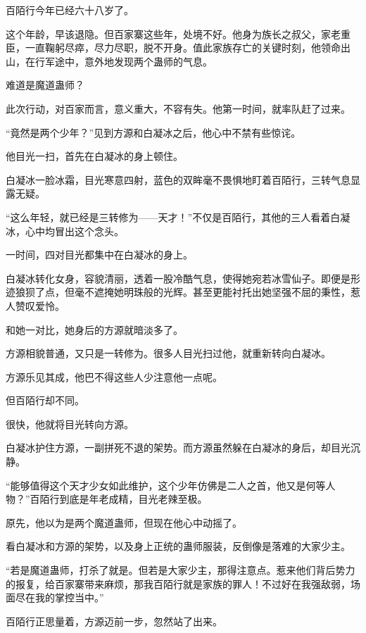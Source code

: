 
\begin{this_body}



百陌行今年已经六十八岁了。

这个年龄，早该退隐。但百家寨这些年，处境不好。他身为族长之叔父，家老重臣，一直鞠躬尽瘁，尽力尽职，脱不开身。值此家族存亡的关键时刻，他领命出山，在行军途中，意外地发现两个蛊师的气息。

难道是魔道蛊师？

此次行动，对百家而言，意义重大，不容有失。他第一时间，就率队赶了过来。

“竟然是两个少年？”见到方源和白凝冰之后，他心中不禁有些惊诧。

他目光一扫，首先在白凝冰的身上顿住。

白凝冰一脸冰霜，目光寒意四射，蓝色的双眸毫不畏惧地盯着百陌行，三转气息显露无疑。

“这么年轻，就已经是三转修为——天才！”不仅是百陌行，其他的三人看着白凝冰，心中均冒出这个念头。

一时间，四对目光都集中在白凝冰的身上。

白凝冰转化女身，容貌清丽，透着一股冷酷气息，使得她宛若冰雪仙子。即便是形迹狼狈了点，但毫不遮掩她明珠般的光辉。甚至更能衬托出她坚强不屈的秉性，惹人赞叹爱怜。

和她一对比，她身后的方源就暗淡多了。

方源相貌普通，又只是一转修为。很多人目光扫过他，就重新转向白凝冰。

方源乐见其成，他巴不得这些人少注意他一点呢。

但百陌行却不同。

很快，他就将目光转向方源。

白凝冰护住方源，一副拼死不退的架势。而方源虽然躲在白凝冰的身后，却目光沉静。

“能够值得这个天才少女如此维护，这个少年仿佛是二人之首，他又是何等人物？”百陌行到底是年老成精，目光老辣至极。

原先，他以为是两个魔道蛊师，但现在他心中动摇了。

看白凝冰和方源的架势，以及身上正统的蛊师服装，反倒像是落难的大家少主。

“若是魔道蛊师，打杀了就是。但若是大家少主，那得注意点。惹来他们背后势力的报复，给百家寨带来麻烦，那我百陌行就是家族的罪人！不过好在我强敌弱，场面尽在我的掌控当中。”

百陌行正思量着，方源迈前一步，忽然站了出来。


\end{this_body}
